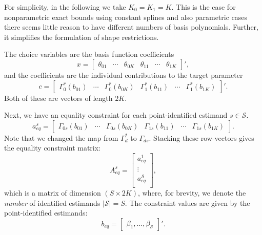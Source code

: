 \documentclass[12pt,a4paper,english]{article} %
\numberwithin{equation}{section}
\theoremstyle{definition}
\theoremstyle{remark}
\theoremstyle{plain}
\begin{document}
For simplicity, in the following we take $K_0 = K_1 = K$. This is the case for nonparametric exact bounds using constant splines and also parametric cases there seems little reason to have different numbers of basis polynomials.
Further, it simplifies the formulation of shape restrictions.

The choice variables are the basis function coefficients
\begin{equation*}
  x =
  \begin{bmatrix}
     \theta_{01} & \cdots & \theta_{0K} & \theta_{11} & \cdots & \theta_{1K}
  \end{bmatrix}',
\end{equation*}
and the coefficients are the individual contributions to the target parameter
\begin{equation*}
  c =
  \begin{bmatrix}
     \Gamma_0^*(b_{01}) & \cdots & \Gamma_0^*(b_{0K}) & \Gamma_1^*(b_{11}) & \cdots & \Gamma_1^*(b_{1K})
  \end{bmatrix}'.
\end{equation*}
Both of these are vectors of length $2K$.

Next, we have an equality constraint for each point-identified estimand $s\in\mathcal{S}$.
\begin{equation*}
  a_{eq}^s =
  \begin{bmatrix}
     \Gamma_{0s}(b_{01}) & \cdots & \Gamma_{0s}(b_{0K}) & \Gamma_{1s}(b_{11}) & \cdots & \Gamma_{1s}(b_{1K})
  \end{bmatrix}.
\end{equation*}
Note that we changed the map from $\Gamma^*_d$ to $\Gamma_{ds}$. Stacking these row-vectors gives the equality constraint matrix:
\begin{equation*}
  A_{eq}^s =
  \begin{bmatrix}
    a_{eq}^1 \\
    \vdots \\
    a_{eq}^\mathcal{S} \\
  \end{bmatrix},
\end{equation*}
which is a matrix of dimension $(S\times 2K)$, where, for brevity, we denote the \textit{number} of identified estimands $|\mathcal{S}| = S$.
The constraint values are given by the point-identified estimands:
\begin{equation*}
  b_{eq} =
  \begin{bmatrix}
    \beta_1, \ldots, \beta_\mathcal{S}
  \end{bmatrix}'.
\end{equation*}
\end{document}

